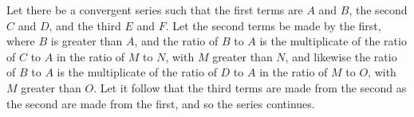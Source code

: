 \documentclass[11pt,letterpaper]{book}
\begin{document}
Let there be a convergent series such that the first terms are $A$ and $B$, the
second $C$ and $D$, and the third $E$ and $F$. Let the second terms be made
by the first, where $B$ is greater than $A$, and the ratio of $B$ to $A$ is the
multiplicate of the ratio of $C$ to $A$ in the ratio of $M$ to $N$, with $M$
greater than $N$, and likewise the ratio of $B$ to $A$ is the multiplicate of
the ratio of $D$ to $A$ in the ratio of $M$ to $O$, with $M$ greater than $O$.
Let it follow that the third terms are made from the second as the second are
made from the first, and so the series continues.

\end{document}
